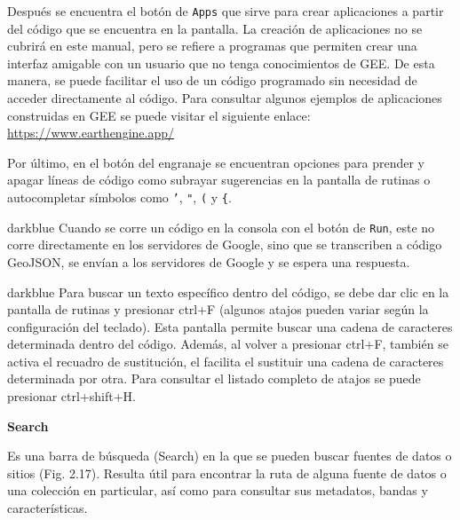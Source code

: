 \documentclass[
  12pt,
  letterpaper,
  twoside]{book}
\begin{document}
Después se encuentra el botón de \texttt{Apps} que sirve para crear aplicaciones a partir del código que se encuentra en la pantalla. La creación de aplicaciones no se cubrirá en este manual, pero se refiere a programas que permiten crear una interfaz amigable con un usuario que no tenga conocimientos de GEE. De esta manera, se puede facilitar el uso de un código programado sin necesidad de acceder directamente al código. Para consultar algunos ejemplos de aplicaciones construidas en GEE se puede visitar el siguiente enlace: \url{https://www.earthengine.app/}

Por último, en el botón del engranaje se encuentran opciones para prender y apagar líneas de código como subrayar sugerencias en la pantalla de rutinas o autocompletar símbolos como \texttt{’}, \texttt{"}, \texttt{(} y \texttt{\{}.

\begin{bluebox2}

\begin{awesomeblock}{5pt}{\faLightbulb}{darkblue}
Cuando se corre un código en la consola con el botón de \texttt{Run}, este no corre directamente en los servidores de Google, sino que se transcriben a código GeoJSON, se envían a los servidores de Google y se espera una respuesta.

\end{awesomeblock}

\end{bluebox2}

\begin{bluebox2}

\begin{awesomeblock}{5pt}{\faLightbulb}{darkblue}
Para buscar un texto específico dentro del código, se debe dar clic en la pantalla de rutinas y presionar ctrl+F (algunos atajos pueden variar según la configuración del teclado). Esta pantalla permite buscar una cadena de caracteres determinada dentro del código. Además, al volver a presionar ctrl+F, también se activa el recuadro de sustitución, el facilita el sustituir una cadena de caracteres determinada por otra. Para consultar el listado completo de atajos se puede presionar ctrl+shift+H.

\end{awesomeblock}

\end{bluebox2}

\textbf{Search}

Es una barra de búsqueda (Search) en la que se pueden buscar fuentes de datos o sitios (Fig. 2.17). Resulta útil para encontrar la ruta de alguna fuente de datos o una colección en particular, así como para consultar sus metadatos, bandas y características.
\end{document}
